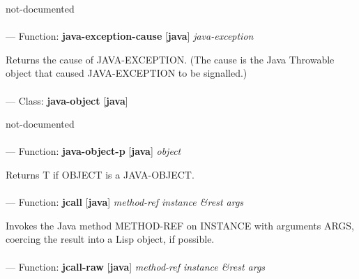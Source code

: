 \begin{adjustwidth}{5em}{5em}
not-documented
\end{adjustwidth}

\paragraph{}
\label{JAVA:JAVA-EXCEPTION-CAUSE}
--- Function: \textbf{java-exception-cause} [\textbf{java}] \textit{java-exception}

\begin{adjustwidth}{5em}{5em}
Returns the cause of JAVA-EXCEPTION. (The cause is the Java Throwable
  object that caused JAVA-EXCEPTION to be signalled.)
\end{adjustwidth}

\paragraph{}
\label{JAVA:JAVA-OBJECT}
--- Class: \textbf{java-object} [\textbf{java}] \textit{}

\begin{adjustwidth}{5em}{5em}
not-documented
\end{adjustwidth}

\paragraph{}
\label{JAVA:JAVA-OBJECT-P}
--- Function: \textbf{java-object-p} [\textbf{java}] \textit{object}

\begin{adjustwidth}{5em}{5em}
Returns T if OBJECT is a JAVA-OBJECT.
\end{adjustwidth}

\paragraph{}
\label{JAVA:JCALL}
--- Function: \textbf{jcall} [\textbf{java}] \textit{method-ref instance \&rest args}

\begin{adjustwidth}{5em}{5em}
Invokes the Java method METHOD-REF on INSTANCE with arguments ARGS, coercing the result into a Lisp object, if possible.
\end{adjustwidth}

\paragraph{}
\label{JAVA:JCALL-RAW}
--- Function: \textbf{jcall-raw} [\textbf{java}] \textit{method-ref instance \&rest args}

